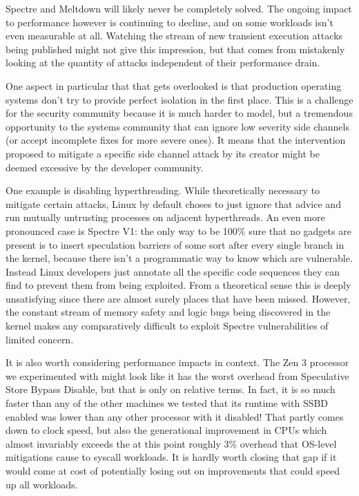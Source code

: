 Spectre and Meltdown will likely never be completely solved.
The ongoing impact to performance however is continuing to decline, and on some workloads isn't even measurable at all.
Watching the stream of new transient execution attacks being published might not give this impression, but that comes from mistakenly looking at the quantity of attacks independent of their performance drain.

One aspect in particular that that gets overlooked is that production operating systems don't try to provide perfect isolation in the first place.
This is a challenge for the security community because it is much harder to model, but a tremendous opportunity to the systems community that can ignore low severity side channels (or accept incomplete fixes for more severe ones).
It means that the intervention proposed to mitigate a specific side channel attack by its creator might be deemed excessive by the developer community.

One example is disabling hyperthreading.
While theoretically necessary to mitigate certain attacks, Linux by default choses to just ignore that advice and run mutually untrusting processes on adjacent hyperthreads.
An even more pronounced case is Spectre V1: the only way to be 100\% sure that no gadgets are present is to insert speculation barriers of some sort after every single branch in the kernel, because there isn't a programmatic way to know which are vulnerable.
Instead Linux developers just annotate all the specific code sequences they can find to prevent them from being exploited.
From a theoretical sense this is deeply unsatisfying since there are almost surely places that have been missed.
However, the constant stream of memory safety and logic bugs being discovered in the kernel makes any comparatively difficult to exploit Spectre vulnerabilities of limited concern.

It is also worth considering performance impacts in context.
The Zen 3 processor we experimented with might look like it has the worst overhead from Speculative Store Bypass Disable, but that is only on relative terms.
In fact, it is so much faster than any of the other machines we tested that its runtime with SSBD enabled was lower than any other processor with it disabled!
That partly comes down to clock speed, but also the generational improvement in CPUs which almost invariably exceeds the at this point roughly 3\% overhead that OS-level mitigations cause to syscall workloads.
It is hardly worth closing that gap if it would come at cost of potentially losing out on improvements that could speed up all workloads.


